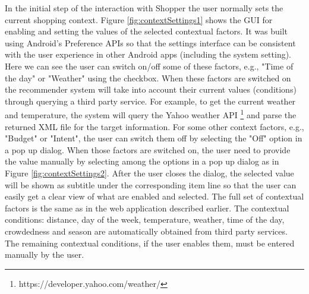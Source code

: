 In the initial step of the interaction with Shopper the user normally sets the current shopping context. Figure \ref{fig:contextSettings1} shows the GUI for enabling and setting the values of the selected contextual factors. It was built using Android's Preference APIs so that the settings interface can be consistent with the user experience in other Android apps (including the system setting). Here we can see the user can switch on/off some of these factors, e.g., "Time of the day"  or "Weather" using the checkbox. When these factors are switched on the recommender system will take into account their current values (conditions) through querying a third party service. For example, to get the current weather and temperature, the system will query the Yahoo weather API \footnote{https://developer.yahoo.com/weather/} and parse the returned XML file for the target information. For some other context factors, e.g., "Budget" or "Intent", the user can switch them off by selecting the "Off" option in a pop up dialog. When those factors are switched on, the user need to provide the value manually by selecting among the options in a pop up dialog as in Figure \ref{fig:contextSettings2}. After the user closes the dialog, the selected value will be shown as subtitle under the corresponding item line so that the user can easily get a clear view of what are enabled and selected. The full set of contextual factors is the same as in the web application described earlier. The contextual conditions: distance, day of the week, temperature, weather, time of the day, crowdedness and season are automatically obtained from third party services. The remaining contextual conditions, if the user enables them, must be entered manually by the user.


